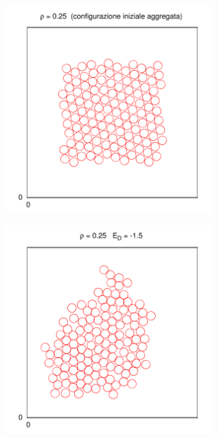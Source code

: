 \documentclass[11pt]{article}
\theoremstyle{plain}
\theoremstyle{remark}
\begin{document}
\begin{figure}
\begin{subfigure}[b]{0.5\textwidth}
        \end{subfigure}
        ~ %

        \begin{subfigure}[b]{0.5\textwidth}
                \centering
                \includegraphics[width=0.85\textwidth]{Immagini/Soffici/SnapSolidoFreddo_Inizio_2D}
        \end{subfigure}
         \begin{subfigure}[b]{0.5\textwidth}
                \centering
                \includegraphics[width=0.85\textwidth]{Immagini/Soffici/SnapSolidoFreddo_2D}
        \end{subfigure}
		

\end{figure}
\end{document}
